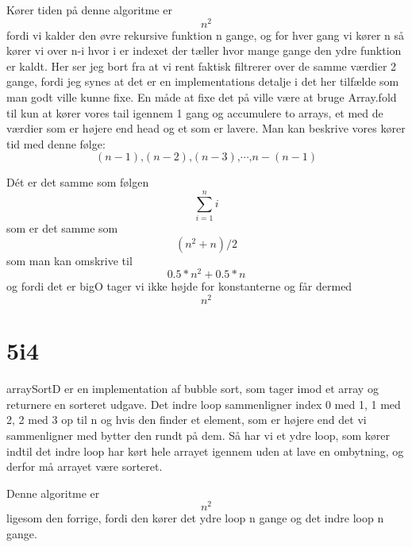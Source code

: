 \documentclass[12pt, a4paper, hidelinks]{article}
\begin{document}
Kører tiden på denne algoritme er $$ n^2 $$ fordi vi kalder den øvre rekursive funktion n gange, og for hver gang vi kører n så kører vi over n-i hvor i er indexet der tæller hvor mange gange den ydre funktion er kaldt. Her ser jeg bort fra at vi rent faktisk filtrerer over de samme værdier 2 gange, fordi jeg synes at det er en implementations detalje i det her tilfælde som man godt ville kunne fixe. En måde at fixe det på ville være at bruge Array.fold til kun at kører vores tail igennem 1 gang og accumulere to arrays, et med de værdier som er højere end head og et som er lavere. 
Man kan beskrive vores kører tid med denne følge:
$$ (n-1)\text{,} (n-2)\text{,} (n-3) \text{,} \cdots \text{,} n-(n-1) $$

Dét er det samme som følgen $$ \sum_{i=1}^{n} i  $$ som er det samme som $$ (n^2+n)/2 $$
som man kan omskrive til $$ 0.5*n^2+0.5*n $$ og fordi det er bigO tager vi ikke højde for konstanterne og får dermed $$ n^2 $$  

\section{5i4}
arraySortD er en implementation af bubble sort, som tager imod et array og returnere en sorteret udgave.
Det indre loop sammenligner index 0 med 1, 1 med 2, 2 med 3 op til n og hvis den finder et element, som er højere end det vi sammenligner med bytter den rundt på dem.
Så har vi et ydre loop, som kører indtil det indre loop har kørt hele arrayet igennem uden at lave en ombytning, og derfor må arrayet være sorteret.

Denne algoritme er $$ n^2 $$ ligesom den forrige, fordi den kører det ydre loop n gange og det indre loop n gange. 
\end{document}
